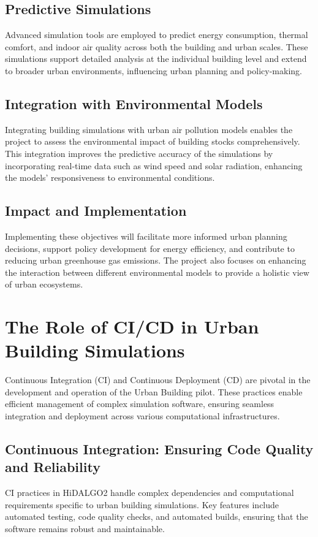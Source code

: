 \documentclass[runningheads]{llncs}
\begin{document}
\subsection{Predictive Simulations}
Advanced simulation tools are employed to predict energy consumption, thermal comfort, and indoor air quality across both the building and urban scales. These simulations support detailed analysis at the individual building level and extend to broader urban environments, influencing urban planning and policy-making.

\subsection{Integration with Environmental Models}
Integrating building simulations with urban air pollution models enables the project to assess the environmental impact of building stocks comprehensively. This integration improves the predictive accuracy of the simulations by incorporating real-time data such as wind speed and solar radiation, enhancing the models' responsiveness to environmental conditions.

\subsection{Impact and Implementation}
Implementing these objectives will facilitate more informed urban planning decisions, support policy development for energy efficiency, and contribute to reducing urban greenhouse gas emissions. The project also focuses on enhancing the interaction between different environmental models to provide a holistic view of urban ecosystems.

\section{The Role of CI/CD in Urban Building Simulations}
Continuous Integration (CI) and Continuous Deployment (CD) are pivotal in the development and operation of the Urban Building pilot. These practices enable efficient management of complex simulation software, ensuring seamless integration and deployment across various computational infrastructures.

\subsection{Continuous Integration: Ensuring Code Quality and Reliability}
CI practices in HiDALGO2 handle complex dependencies and computational requirements specific to urban building simulations. Key features include automated testing, code quality checks, and automated builds, ensuring that the software remains robust and maintainable.
\end{document}
